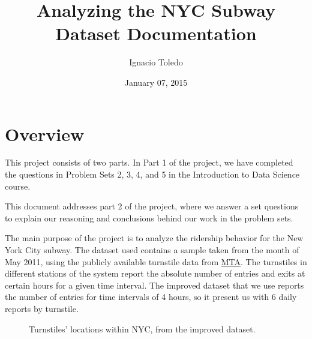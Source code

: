 \documentclass[letterpaper,10pt,english]{sphinxmanual}
\title{Analyzing the NYC Subway Dataset Documentation}
\date{January 07, 2015}
\author{Ignacio Toledo}
\begin{document}
\maketitle
\tableofcontents
{}\label{index::doc}



\chapter{Overview}
\label{overview:overview}\label{overview::doc}\label{overview:welcome-to-analyzing-the-nyc-subway-dataset-s-documentation}
This project consists of two parts. In Part 1 of the project, we have completed
the questions in Problem Sets 2, 3, 4, and 5 in the Introduction to
Data Science course.

This document addresses part 2 of the project, where we answer a set questions
to explain our reasoning and conclusions behind our work in the problem sets.

The main purpose of the project is to analyze the ridership behavior for the
New York City subway. The dataset used contains a sample taken from the month
of May 2011, using the publicly available turnstile data from
\href{http://web.mta.info/developers/turnstile.html}{MTA}. The turnstiles in
different stations of the system report the absolute number of entries and exits
at certain hours for a given time interval. The improved dataset that we use
reports the number of entries for time intervals of 4 hours, so it present us
with 6 daily reports by turnstile.
\begin{figure}[htbp]
\centering
\capstart

\caption{Turnstiles' locations within NYC, from the improved dataset.}\end{figure}
\end{document}
